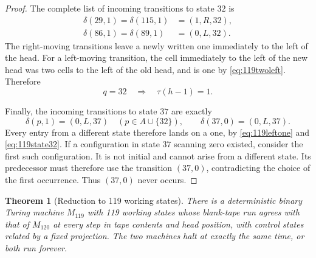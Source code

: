 \documentclass[11pt]{article}
\newtheorem{theorem}{Theorem}[section]
\begin{document}
\begin{proof}
The complete list of incoming transitions to state $32$ is
\[
\begin{aligned}
 \delta(29,1)=\delta(115,1)&=(1,R,32),\\
 \delta(86,1)=\delta(89,1)&=(0,L,32).
\end{aligned}
\]
The right-moving transitions leave a newly written one immediately to
the left of the head. For a left-moving transition, the cell immediately
to the left of the new head was two cells to the left of the old head,
and is one by \eqref{eq:119twoleft}. Therefore
\begin{equation}
\label{eq:119state32}
 q=32\quad\Longrightarrow\quad\tau(h-1)=1.
\end{equation}

Finally, the incoming transitions to state $37$ are exactly
\[
 \delta(p,1)=(0,L,37)\quad(p\in A\cup\{32\}),
 \qquad \delta(37,0)=(0,L,37).
\]
Every entry from a different state therefore lands on a one, by
\eqref{eq:119leftone} and \eqref{eq:119state32}.
If a configuration in state $37$ scanning zero existed, consider the
first such configuration. It is not initial and cannot arise from a
different state. Its predecessor must therefore use the transition
$(37,0)$, contradicting the choice of the first occurrence.
Thus $(37,0)$ never occurs.
\end{proof}

\begin{theorem}[Reduction to 119 working states]
\label{thm:119reduction}
There is a deterministic binary Turing machine $M_{119}$ with 119
working states whose blank-tape run agrees with that of $M_{120}$ at
every step in tape contents and head position, with control states
related by a fixed projection. The two machines halt at exactly the
same time, or both run forever.
\end{theorem}
\end{document}
